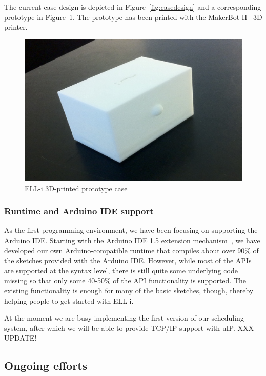 \documentclass[final]{siamltex}
\begin{document}
The current case design is depicted in Figure~\ref{fig:casedesign} and
a corresponding prototype in Figure~\ref{fig:case}.  The prototype has
been printed with the MakerBot II~\cite{MakerBotII} 3D printer.

\begin{figure}
\centering
\includegraphics[scale=.4]{figure-case.eps}
\caption{ELL-i 3D-printed prototype case}
\label{fig:case}
\end{figure}


\subsubsection{Runtime and Arduino IDE support}

As the first programming environment, we have been focusing on
supporting the Arduino IDE.  Starting with the Arduino IDE 1.5
extension mechanism~\cite{ArduinoIDEextension}, we have developed our
own Arduino-compatible runtime that compiles about over 90\% of the
sketches provided with the Arduino IDE.  However, while most of the
APIs are supported at the syntax level, there is still quite some
underlying code missing so that only some 40-50\% of the API
functionality is supported.  The existing functionality is enough for
many of the basic sketches, though, thereby helping people to get
started with ELL-i.

At the moment we are busy implementing the first version of our
scheduling system, after which we will be able to provide TCP/IP
support with uIP.  XXX UPDATE!

\subsection{Ongoing efforts}
\end{document}
